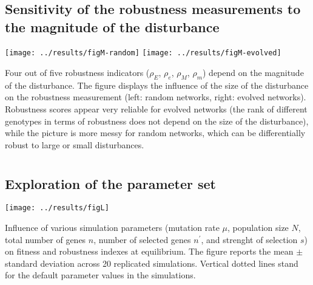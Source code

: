 \documentclass[10pt,a4paper]{article}
\newcommand{\earlyenv}{{\rho_E}}
\newcommand{\lateenv}{{\rho_e}}
\newcommand{\earlymut}{{\rho_M}}
\newcommand{\latemut}{{\rho_m}}
\begin{document}
\begin{appendices}
  \clearpage
  \section{}
    \label{supp:sensitmag}
    \subsection*{Sensitivity of the robustness measurements to the magnitude of the disturbance}
	\begin{center}
	\texttt{[image: ../results/figM-random]} \texttt{[image: ../results/figM-evolved]}
	\end{center}
	{\color{Gray} Four out of five robustness indicators ($\earlyenv$, $\lateenv$, $\earlymut$, $\latemut$) depend on the magnitude of the disturbance. The figure displays the influence of the size of the disturbance on the robustness measurement (left: random networks, right: evolved networks). Robustness scores appear very reliable for evolved networks (the rank of different genotypes in terms of robustness does not depend on the size of the disturbance), while the picture is more messy for random networks, which can be differentially robust to large or small disturbances. }


  \clearpage
  \section{}
    \label{supp:explo}
    \subsection*{Exploration of the parameter set}
	\begin{center}
	\texttt{[image: ../results/figL]} 
	\end{center}
	
	{\color{Gray}Influence of various simulation parameters (mutation rate $\mu$, population size $N$, total number of genes $n$, number of selected genes $n^\prime$, and strenght of selection $s$) on fitness and robustness indexes at equilibrium. The figure reports the mean $\pm$ standard deviation across 20 replicated simulations. Vertical dotted lines stand for the default parameter values in the simulations. }




\end{appendices}
\end{document}

